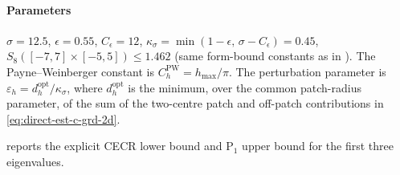 \documentclass[11pt]{article}
\theoremstyle{plain}
\theoremstyle{definition}
\theoremstyle{remark}
\begin{document}
\paragraph{Parameters}
$\sigma=12.5$, $\epsilon=0.55$, $C_\epsilon=12$,
$\kappa_\sigma=\min(1-\epsilon,\,\sigma-C_\epsilon)=0.45$,
$S_8([-7,7]\times[-5,5])\le1.462$
(same form-bound constants as in ).
The Payne--Weinberger constant is $C_h^{\mathrm{PW}}=h_{\max}/\pi$.
The perturbation parameter is $\varepsilon_h=d_h^{\mathrm{opt}}/\kappa_\sigma$,
where \(d_h^{\mathrm{opt}}\) is the minimum, over the common patch-radius
parameter, of the sum of the two-centre patch and off-patch contributions in
\eqref{eq:direct-est-c-grd-2d}.

 reports the explicit CECR lower
bound and $\mathrm{P}_1$ upper bound for the first three eigenvalues.
\end{document}
